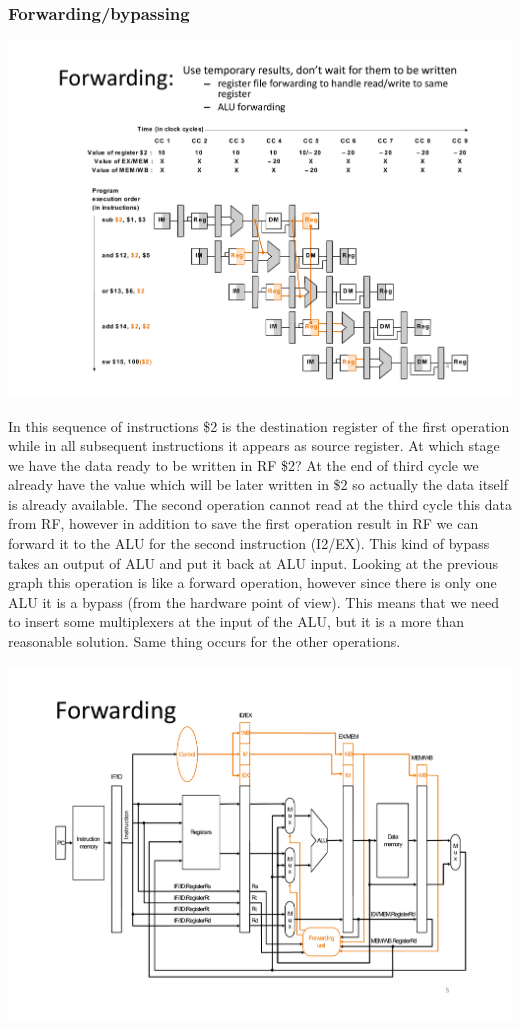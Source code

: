 \subsubsection{Forwarding/bypassing}
\begin{center}
  \includegraphics[width=1.0\linewidth]{img/img3/mips3}
\end{center}
In this sequence of instructions \$2 is the destination register of the first
operation while in all subsequent instructions it appears as source register.
At which stage we have the data ready to be written in RF \$2? At the end of
third cycle we already have the value which will be later written in \$2 so
actually the data itself is already available. The second operation cannot read
at the third cycle this data from RF, however in addition to save the first
operation result in RF we can forward it to the ALU for the second instruction
(I2/EX). This kind of bypass takes an output of ALU and put it back at ALU
input. Looking at the previous graph this operation is like a forward operation,
however since there is only one ALU it is a bypass (from the hardware point of
view). This means that we need to insert some multiplexers at the input of the
ALU, but it is a more than reasonable solution. Same thing occurs for the other
operations.
\begin{center}
  \includegraphics[width=0.8\linewidth]{img/img3/mips4}
\end{center}
